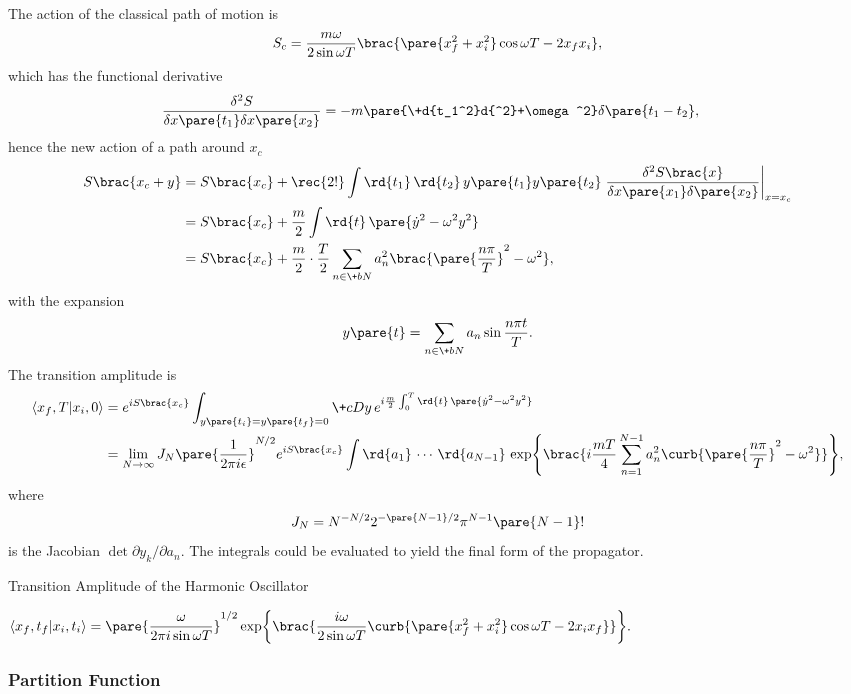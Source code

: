 \documentclass[hidelinks]{article}
\begin{document}
The action of the classical path of motion is
\begin{equation}
    \label{eq:SHO_action_classical_path}
    S_c = \frac{m\omega}{2\sin\omega T}\brac{\pare{x_f^2 + x_i^2}\cos\omega T - 2x_f x_i},
\end{equation}
which has the functional derivative
\begin{align*}
    \frac{\delta^2 S}{\delta x\pare{t_1} \delta x\pare{x_2}} &= -m\pare{\+d{t_1^2}d{^2}+\omega^2}\delta\pare{t_1 - t_2},
\end{align*}
hence the new action of a path around $x_c$
\begin{align*}
    S\brac{x_c+y} &= S\brac{x_c} + \rec{2!}\int \rd{t_1}\,\rd{t_2}\, y\pare{t_1}y\pare{t_2}\left.\frac{\delta^2 S\brac{x}}{\delta x\pare{x_1}\delta\pare{x_2}}\right\vert_{x=x_c} \\
    &= S\brac{x_c} + \frac{m}{2}\int \rd{t}\,\pare{\dot{y}^2 - \omega^2 y^2} \\
    &= S\brac{x_c} + \frac{m}{2}\cdot \frac{T}{2}\sum_{n\in\+bN} a_n^2\brac{\pare{\frac{n\pi}{T}}^2 - \omega^2},
\end{align*}
with the expansion
\[ y\pare{t} = \sum_{n\in\+bN} a_n \sin \frac{n\pi t}{T}. \]
The transition amplitude is
\begin{align*}
    \bra{x_f,T}\ket{x_i,0} &= e^{iS\brac{x_c}}\int_{y\pare{t_i} = y\pare{t_f} = 0}\+cD y\, e^{i\frac{m}{2}\int_{0}^{T} \rd{t}\,\pare{\dot{y}^2 - \omega^2 y^2}} \\
    &= \lim_{N\rightarrow \infty} J_N \pare{\frac{1}{2\pi i\epsilon}}^{N/2} e^{iS\brac{x_c}}\int \rd{a_1}\,\cdots \,\rd{a_{N-1}}\,\exp\brac{i\frac{mT}{4}\sum_{n=1}^{N-1}a_n^2 \curb{\pare{\frac{n\pi}{T}}^2 - \omega^2}},
\end{align*}
where
\[ J_N = N^{-N/2}2^{-\pare{N-1}/2}\pi^{N-1}\pare{N-1}! \]
is the Jacobian $\det \partial y_k/\partial a_n$. The integrals could be evaluated to yield the final form of the propagator.
\begin{finaleq}{Transition Amplitude of the Harmonic Oscillator}
    \centerline{$\displaystyle \bra{x_f,t_f}\ket{x_i,t_i} = \pare{\frac{\omega}{2\pi i\sin \omega T}}^{1/2} \exp\brac{\frac{i\omega}{2\sin\omega T}\curb{\pare{x_f^2 + x_i^2}\cos\omega T - 2x_i x_f}}.$}
\end{finaleq}


\subsubsection{Partition Function} %
\label{ssub:partition_function}
\end{document}
